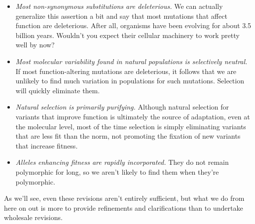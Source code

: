 \begin{itemize}

\item {\it Most non-synonymous substitutions are deleterious.\/} We
  can actually generalize this assertion a bit and say that most
  mutations that affect function are deleterious. After all, organisms
  have been evolving for about 3.5 billion years. Wouldn't you expect
  their cellular machinery to work pretty well by now?

\item {\it Most molecular variability found in natural populations is
    selectively neutral.} If most function-altering mutations are
  deleterious, it follows that we are unlikely to find much variation
  in populations for such mutations. Selection will quickly eliminate
  them.

\item {\it Natural selection is primarily purifying.} Although natural
  selection for variants that improve function is ultimately the
  source of adaptation, even at the molecular level, most of the time
  selection is simply eliminating variants that are less fit than the
  norm, not promoting the fixation of new variants that increase
  fitness.

\item {\it Alleles enhancing fitness are rapidly incorporated.} They
  do not remain polymorphic for long, so we aren't likely to find
  them when they're polymorphic.

\end{itemize}

As we'll see, even these revisions aren't entirely sufficient, but
what we do from here on out is more to provide refinements and
clarifications than to undertake wholesale revisions.


